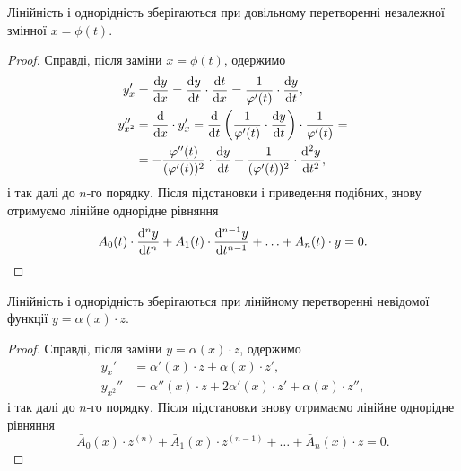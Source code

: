 \begin{theorem}
	Лінійність і однорідність зберігаються при довільному перетворенні незалежної змінної $x = \phi(t)$.
\end{theorem}
\begin{proof}
	Справді, після заміни $x = \phi(t)$, одержимо
	\begin{align}
		y_x' &= \frac{\diff y}{\diff x} = \frac{\diff y}{\diff t} \cdot \frac{\diff t}{\diff x} = \frac{1}{\phi'(t)} \cdot \frac{\diff y}{\diff t}, \\
		y_{x^2}'' &= \frac{\diff}{\diff x} \cdot y_x' = \frac{\diff}{\diff t} \left( \frac{1}{\phi'(t)} \cdot \frac{\diff y}{\diff t} \right) \cdot \frac{1}{\phi'(t)} = \\
		&= - \frac{\phi''(t)}{(\phi'(t))^2} \cdot \frac{\diff y}{\diff t} + \frac{1}{(\phi'(t))^2} \cdot \frac{\diff^2 y}{\diff t^2}, \nonumber
	\end{align}
	і так далі до $n$-го порядку. Після підстановки і приведення подібних, знову отримуємо лінійне однорідне рівняння
	\begin{equation*}
		A_0(t) \cdot \frac{\mathop{}\!\mathrm{d}^n y}{\mathop{}\!\mathrm{d} t^n} + A_1(t) \cdot \frac{\mathop{}\!\mathrm{d}^{n - 1} y}{\mathop{}\!\mathrm{d} t^{n - 1}} + \ldots + A_n(t) \cdot y = 0.
	\end{equation*}
\end{proof}

\begin{theorem}
	Лінійність і однорідність зберігаються при лінійному перетворенні невідомої функції $y = \alpha (x) \cdot z$.
\end{theorem}
\begin{proof}
	Справді, після заміни $y = \alpha (x) \cdot z$, одержимо
	\begin{align}
		y_x' &= \alpha'(x) \cdot z + \alpha(x) \cdot z', \\
		y_{x^2}'' &= \alpha''(x) \cdot z + 2 \alpha'(x) \cdot z' + \alpha(x) \cdot z'',
	\end{align}
	і так далі до $n$-го порядку. Після підстановки знову отримаємо лінійне однорідне рівняння
	\begin{equation*}
		\bar A_0(x) \cdot z^{(n)} + \bar A_1(x) \cdot z^{(n - 1)} + \ldots + \bar A_n(x) \cdot z = 0.
	\end{equation*}
\end{proof}